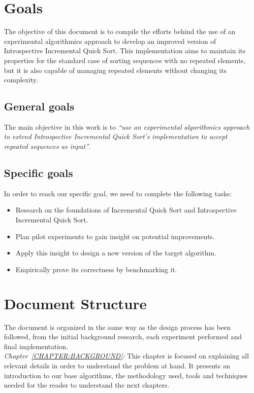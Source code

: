 \section{Goals}
The objective of this document is to compile the efforts behind the use of an experimental algorithmics approach to develop an improved version of Introspective Incremental Quick Sort. This implementation aims to maintain its properties for the standard case of sorting sequences with no repeated elements, but it is also capable of managing repeated elements without changing its complexity.\\

\subsection{General goals}
The main objective in this work is to \emph{``use an experimental algorithmics approach to extend Introspective Incremental Quick Sort's implementation to accept repeated sequences as input''}.\\

\subsection{Specific goals}
In order to reach our specific goal, we need to complete the following tasks:

\begin{itemize}
    \item Research on the foundations of Incremental Quick Sort and Introspective Incremental Quick Sort.
    \item Plan pilot experiments to gain insight on potential improvements.
    \item Apply this insight to design a new version of the target algorithm.
    \item Empirically prove its correctness by benchmarking it. 
\end{itemize}

\section{Document Structure}
The document is organized in the same way as the design process has been followed, from the initial background research, each experiment performed and final implementation.\\

\emph{Chapter~\ref{CHAPTER:BACKGROUND}:} This chapter is focused on explaining all relevant details in order to understand the problem at hand. It presents an introduction to our base algorithms, the methodology used, tools and techniques needed for the reader to understand the next chapters.\\

